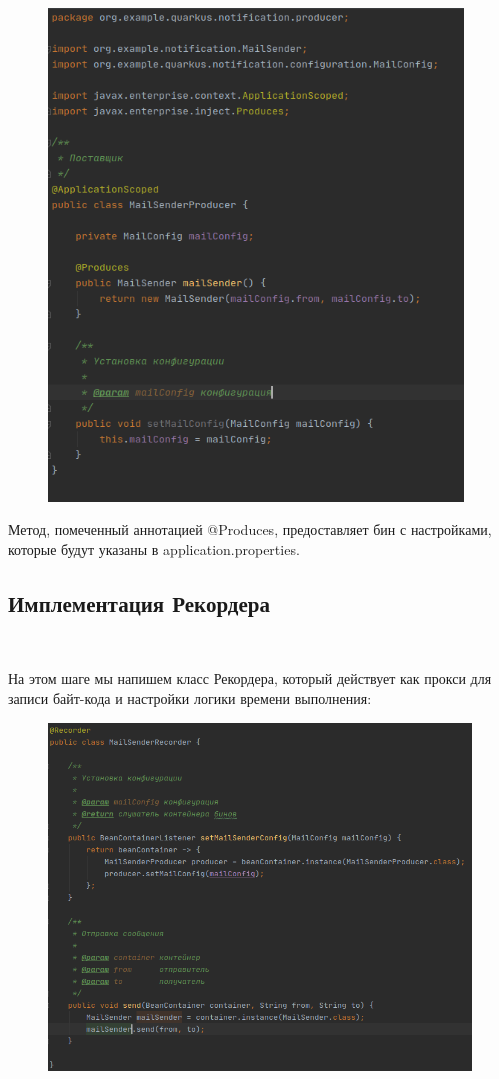 \documentclass[russian,11pt]{article}
\begin{document}
\begin{figure}[H]
	\centering
	\includegraphics[scale=0.5, width=11cm]{7}
\end{figure}
	
	Метод, помеченный аннотацией @Produces, предоставляет бин с настройками, которые будут указаны в application.properties.

\subsection{Имплементация Рекордера}
~

На этом шаге мы напишем класс Рекордера, который действует как прокси для записи байт-кода и настройки логики времени выполнения:

\begin{figure}[H]
	\centering
	\includegraphics[width=13cm]{8}
\end{figure}
~
\end{document}

